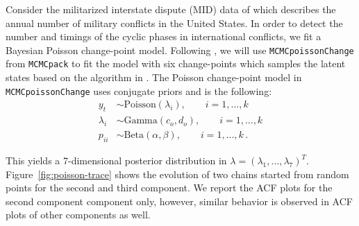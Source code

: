 \documentclass[12pt]{article}
\theoremstyle{remark}
\begin{document}
Consider the militarized interstate dispute (MID) data of \cite{martin2011mcmcpack} which describes the annual number of military conflicts in the United States. In order to detect the number and timings of the cyclic phases in international conflicts, we fit a Bayesian Poisson change-point model. Following \cite{martin2011mcmcpack}, we will use \texttt{MCMCpoissonChange} from \texttt{MCMCpack} to fit the model with six change-points which samples the latent states based on the algorithm in \cite{chib1998estimation}. The Poisson change-point model in \texttt{MCMCpoissonChange} uses conjugate priors and is the following:
%
\begin{align*}
    y_t &\sim \text{Poisson}(\lambda_i), \qquad i = 1, ..., k\\
    \lambda_i &\sim \text{Gamma}(c_o, d_o), \qquad i = 1,..., k\\
    p_{ii} &\sim \text{Beta}(\alpha, \beta), \qquad i = 1,..., k\,.
\end{align*}

This yields a 7-dimensional posterior distribution in $\lambda = (\lambda_1, \dots, \lambda_7)^T$. Figure~\ref{fig:poisson-trace} shows the evolution of two chains started from random points for the second and third component. We report the ACF plots for the second component component only, however, similar behavior is observed in ACF plots of other components as well.
\end{document}
